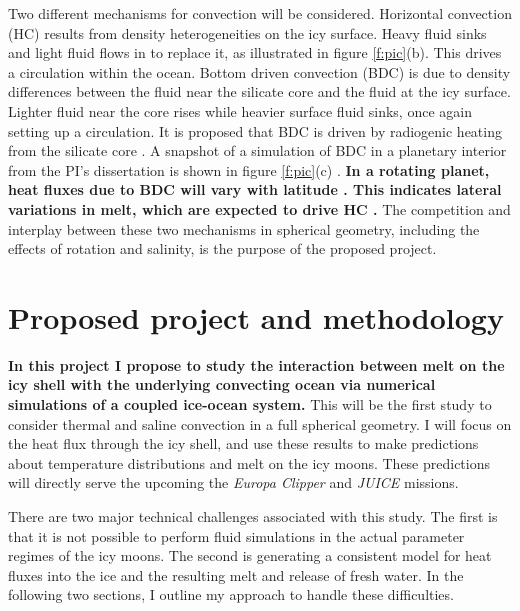 \documentclass[12pt]{article}
\begin{document}
Two different mechanisms for convection will be considered.
Horizontal convection (HC) results from density heterogeneities on the icy surface. Heavy fluid sinks and light fluid flows in to replace it, as illustrated in figure \ref{f:pic}(b). This drives a circulation within the ocean. Bottom driven convection (BDC) is due to density differences between the fluid near the silicate core and the fluid at the icy surface. Lighter fluid near the core rises while heavier surface fluid sinks, once again setting up a circulation. 
It is proposed that BDC is driven by radiogenic heating from the silicate core \citep{kS14,kS19,jK22}. A snapshot of a simulation of BDC in a planetary interior from the PI's dissertation is shown in figure \ref{f:pic}(c) \citep{tO25}. 
\textbf{In a rotating planet, heat fluxes due to BDC will vary with latitude \citep{kS14}. This indicates lateral variations in melt, which are expected to drive HC \citep{wK22}.}
The competition and interplay between these two mechanisms in spherical geometry, including the effects of rotation and salinity, is the purpose of the proposed project.


\section{Proposed project and methodology}

\textbf{In this project I propose to study the interaction between melt on the icy shell with the underlying convecting ocean via numerical simulations of a coupled ice-ocean system.} This will be the first study to consider thermal and saline convection in a full spherical geometry.
I will focus on the heat flux through the icy shell, and use these results to make predictions about temperature distributions and melt on the icy moons. These predictions will directly serve the upcoming the \textit{Europa Clipper} and \textit{JUICE} missions.

There are two major technical challenges associated with this study. The first is that it is not possible to perform fluid simulations in the actual parameter regimes of the icy moons. The second is generating a consistent model for heat fluxes into the ice and the resulting melt and release of fresh water.
In the following two sections, I outline my approach to handle these difficulties.
\end{document}
